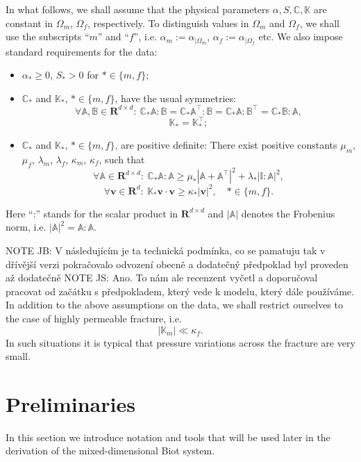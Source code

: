 \documentclass[a4paper]{article}
\numberwithin{equation}{section}
\def\CC{\tn C}
\def\Real{{\mathbf R}} %
\def\tn#1{{\mathbb{#1}}}    %
\def\vc#1{\mathbf{#1}}     %
\def\vv{\vc v}
\newcommand{\eq}[1]{\begin{equation}#1\end{equation}}
\newcommand{\eqs}[1]{\begin{equation*}#1\end{equation*}}
\def\jb#1{NOTE JB: {\color{violet}#1}}
\def\js#1{NOTE JS: {\color{blue}#1}}
\begin{document}
In what follows, we shall assume that the physical parameters $\alpha,S,\CC,\tn K$ are constant in $\Omega_m$, $\Omega_f$, respectively.
To distinguish values in $\Omega_m$ and $\Omega_f$, we shall use the subscripts ``$m$'' and ``$f$'', i.e. $\alpha_m := \alpha_{|\Omega_m}$, $\alpha_f := \alpha_{|\Omega_f}$ etc.
We also impose standard requirements for the data:
\begin{itemize}
\item $\alpha_*\ge 0$, $S_*>0$ for $*\in\{m,f\}$;
\item $\CC_*$ and $\tn K_*$, $*\in\{m,f\}$, have the usual symmetries:
\eqs{ \forall \tn A,\tn B\in\Real^{d\times d}:~ \CC_*\tn A:\tn B=\CC_*\tn A^\top:\tn B=\CC_*\tn A:\tn B^\top=\CC_*\tn B:\tn A, }
\eqs{ \tn K_* = \tn K_*^\top; }
\item $\CC_*$ and $\tn K_*$, $*\in\{m,f\}$, are positive definite: %
There exist positive constants $\mu_m$, $\mu_f$, $\lambda_m$, $\lambda_f$, $\kappa_m$, $\kappa_f$, such that
\eq{ \label{eq:pos_def_C_gen} \forall\tn A\in\Real^{d\times d}:~\CC_*\tn A:\tn A \ge \mu_*\left|\tn A+\tn A^\top\right|^2 + \lambda_*|\tn I:\tn A|^2, }
\eq{ \label{eq:pos_def_K} \forall\vv\in\Real^d:~\tn K_*\vv\cdot\vv \ge \kappa_*|\vv|^2,\quad *\in\{m,f\}. }
\end{itemize}
Here ``:'' stands for the scalar product in $\Real^{d\times d}$ and $|\tn A|$ denotes the Frobenius norm, i.e. $|\tn A|^2=\tn A:\tn A$.

\jb{V následujícím je ta technická podmínka, co se pamatuju tak v dřívější verzi pokračovalo odvození obecně a dodatečný předpoklad byl proveden až dodatečně}
\js{Ano. To nám ale recenzent vyčetl a doporučoval pracovat od začátku s předpokladem, který vede k modelu, který dále používáme.}
In addition to the above assumptions on the data, we shall restrict ourselves to the case of highly permeable fracture, i.e.
\eq{\label{eq:asm_permeable_frac} |\tn K_m|\ll \kappa_f. }
In such situations it is typical that pressure variations across the fracture are very small.


\section{Preliminaries}\label{sec:calculus}

In this section we introduce notation and tools that will be used later in the derivation of the mixed-dimensional Biot system.
\end{document}
